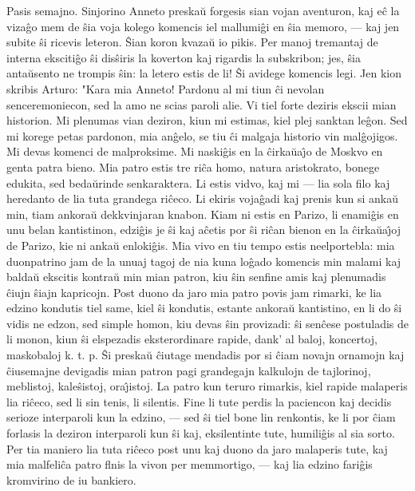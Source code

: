    Pasis semajno. Sinjorino Anneto preska\u u forgesis sian vojan
aventuron, kaj e\^c la viza\^go mem de \^sia voja kolego komencis
iel mallumi\^gi en \^sia memoro, --- kaj jen subite \^si ricevis
leteron. \^Sian koron kvaza\u u io pikis. Per manoj tremantaj de
interna eksciti\^go \^si dis\^siris la koverton kaj rigardis la
subskribon; jes, \^sia anta\u usento ne trompis \^sin: la letero
estis de li! \^Si avidege komencis legi. Jen kion skribis Arturo:
"Kara mia Anneto! Pardonu al mi tiun \^ci nevolan senceremoniecon,
sed la amo ne scias paroli alie. Vi tiel forte deziris ekscii mian
historion. Mi plenumas vian deziron, kiun mi estimas, kiel plej
sanktan le\^gon. Sed mi korege petas pardonon, mia an\^gelo, se tiu
\^ci malgaja historio vin mal\^gojigos. Mi devas komenci de
malproksime. Mi naski\^gis en la \^cirka\u ua\^{\j}o de Moskvo en
genta patra bieno. Mia patro estis tre ri\^ca homo, natura
aristokrato, bonege edukita, sed beda\u urinde senkaraktera. Li
estis vidvo, kaj mi --- lia sola filo kaj heredanto de lia tuta
grandega ri\^ceco. Li ekiris voja\^gadi kaj prenis kun si anka\u u
min, tiam ankora\u u dekkvinjaran knabon. Kiam ni estis en Parizo,
li enami\^gis en unu belan kantistinon, edzi\^gis je \^si kaj
a\^cetis por \^si ri\^can bienon en la \^cirka\u ua\^{\j}oj de
Parizo, kie ni anka\u u enloki\^gis. Mia vivo en tiu tempo estis
neelportebla: mia duonpatrino jam de la unuaj tagoj de nia kuna
lo\^gado komencis min malami kaj balda\u u ekscitis kontra\u u min
mian patron, kiu \^sin senfine amis kaj plenumadis \^ciujn \^siajn
kapricojn. Post duono da jaro mia patro povis jam rimarki, ke lia
edzino kondutis tiel same, kiel \^si kondutis, estante ankora\u u
kantistino, en li do \^si vidis ne edzon, sed simple homon, kiu
devas \^sin provizadi: \^si sen\^cese postuladis de li monon, kiun
\^si elspezadis eksterordinare rapide, dank' al baloj, koncertoj,
maskobaloj k. t. p. \^Si preska\u u \^ciutage mendadis por si \^ciam
novajn ornamojn kaj \^ciusemajne devigadis mian patron pagi
grandegajn kalkulojn de tajlorinoj, meblistoj, kale\^sistoj,
ora\^{\j}istoj. La patro kun teruro rimarkis, kiel rapide malaperis
lia ri\^ceco, sed li sin tenis, li silentis. Fine li tute perdis la
paciencon kaj decidis serioze interparoli kun la edzino, --- sed
\^si tiel bone lin renkontis, ke li por \^ciam forlasis la deziron
interparoli kun \^si kaj, eksilentinte tute, humili\^gis al sia
sorto. Per tia maniero lia tuta ri\^ceco post unu kaj duono da jaro
malaperis tute, kaj mia malfeli\^ca patro flnis la vivon per
memmortigo, --- kaj lia edzino fari\^gis kromvirino de iu bankiero.
